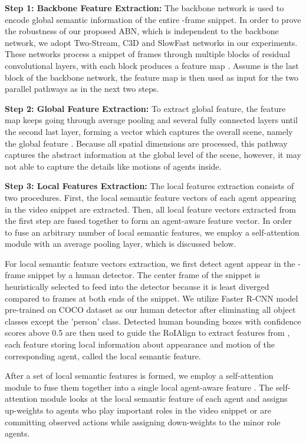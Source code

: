 \documentclass{ieeeaccess}
\begin{document}
\textbf{Step 1: Backbone Feature Extraction:}
 The backbone network is used to encode global semantic information of the entire -frame snippet. In order to prove the robustness of our proposed ABN, which is independent to the backbone network, we adopt Two-Stream, C3D \cite{C3D_3} and SlowFast \cite{SlowFast} networks in our experiments. These networks process a snippet of frames through multiple blocks of residual convolutional layers, with each block  produces a feature map . Assume  is the last block of the backbone network, the feature map  is then used as input for the two parallel pathways as in the next two steps.
 




\textbf{Step 2: Global Feature Extraction:}
To extract global feature, the feature map  keeps going through average pooling and several fully connected layers until the second last layer, forming a vector which captures the overall scene, namely the global feature . Because all spatial dimensions are processed, this pathway captures the abstract information at the global level of the scene, however, it may not able to capture the details like motions of agents inside.

\textbf{Step 3: Local Features Extraction:}
The local features extraction consists of two procedures. First, the local semantic feature vectors of each agent appearing in the video snippet are extracted. Then, all local feature vectors extracted from the first step are fused together to form an agent-aware feature vector. In order to fuse an arbitrary number of local semantic features, we employ a self-attention module with an average pooling layer, which is discussed below. 

For local semantic feature vectors extraction, we first detect agent appear in the -frame snippet by a human detector. The center frame of the snippet is heuristically selected to feed into the detector because it is least diverged compared to frames at both ends of the snippet. We utilize Faster R-CNN \cite{FasterRCNN} model pre-trained on COCO dataset \cite{cocodataset} as our human detector after eliminating all object classes except the 'person' class. Detected human bounding boxes with confidence scores above 0.5 are then used to guide the RoIAlign \cite{MaskRCNN_ICCV17} to extract features from , each feature storing local information about appearance and motion of the corresponding agent, called the local semantic feature.

After a set of local semantic features is formed, we employ a self-attention module to fuse them together into a single local agent-aware feature . The self-attention module looks at the local semantic feature of each agent and assigns up-weights to agents who play important roles in the video snippet or are committing observed actions while assigning down-weights to the minor role agents.
\end{document}
